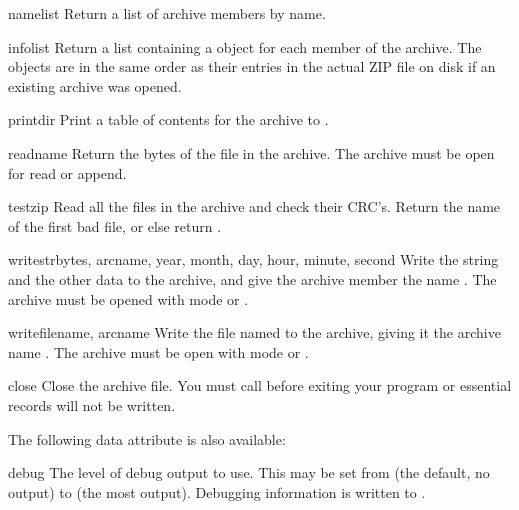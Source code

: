 \begin{methoddesc}{namelist}{}
  Return a list of archive members by name.
\end{methoddesc}

\begin{methoddesc}{infolist}{}
  Return a list containing a  object for each member of
  the archive.  The objects are in the same order as their entries in
  the actual ZIP file on disk if an existing archive was opened.
\end{methoddesc}

\begin{methoddesc}{printdir}{}
  Print a table of contents for the archive to .
\end{methoddesc}

\begin{methoddesc}{read}{name}
  Return the bytes of the file in the archive.  The archive must be
  open for read or append.
\end{methoddesc}

\begin{methoddesc}{testzip}{}
  Read all the files in the archive and check their CRC's.  Return the
  name of the first bad file, or else return .
\end{methoddesc}

\begin{methoddesc}{writestr}{bytes, arcname, year, month, day,
                             hour, minute, second}
  Write the string  and the other data to the archive, and
  give the archive member the name .  The archive must be
  opened with mode  or .
\end{methoddesc}

\begin{methoddesc}{write}{filename, arcname}
  Write the file named  to the archive, giving it the
  archive name .  The archive must be open with mode
   or .
\end{methoddesc}

\begin{methoddesc}{close}{}
  Close the archive file.  You must call  before
  exiting your program or essential records will not be written. 
\end{methoddesc}


The following data attribute is also available:

\begin{memberdesc}{debug}
  The level of debug output to use.  This may be set from 
  (the default, no output) to  (the most output).  Debugging
  information is written to .
\end{memberdesc}


